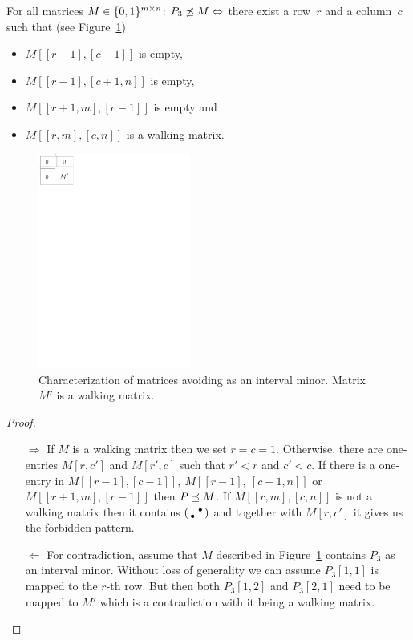 \begin{prop}
\label{prop:p31}
For all matrices $M\in\{0,1\}^{m\times n}$: $P_3\not\preceq M\Leftrightarrow$ there exist a row~$r$ and a column~$c$ such that (see Figure~\ref{fig:p12})
\begin{itemize}
\item $M[[r-1],[c-1]]$ is empty,
\item $M[[r-1],[c+1,n]]$ is empty,
\item $M[[r+1,m],[c-1]]$ is empty and
\item $M[[r,m],[c,n]]$ is a walking matrix.
\end{itemize}
\end{prop}
\begin{figure}[!ht]
\centering
\includegraphics[width=50mm]{img/p12.pdf}
\caption{Characterization of matrices avoiding \usebox{\smlmat} as an interval minor. Matrix $M'$ is a walking matrix.}
\label{fig:p12}
\end{figure}
\begin{proof}
\begin{itemize}
	\item[$\Rightarrow$] If $M$ is a walking matrix then we set $r=c=1$. Otherwise, there are one-entries $M[r,c']$ and $M[r',c]$ such that $r'<r$ and $c'<c$. If there is a one-entry in $M[[r-1],[c-1]],\ M[[r-1],\ [c+1,n]]$ or $M[[r+1,m],[c-1]]$ then $P\preceq M$. If $M[[r,m],[c,n]]$ is not a walking matrix then it contains $\left(\begin{smallmatrix} &\bullet\\\bullet& \end{smallmatrix}\right)$ and together with $M[r,c']$ it gives us the forbidden pattern.
	\item[$\Leftarrow$] For contradiction, assume that $M$ described in Figure~\ref{fig:p12} contains $P_3$ as an interval minor. Without loss of generality we can assume $P_3[1,1]$ is mapped to the $r$-th row. But then both $P_3[1,2]$ and $P_3[2,1]$ need to be mapped to $M'$ which is a contradiction with it being a walking matrix.
\end{itemize}
\end{proof}

